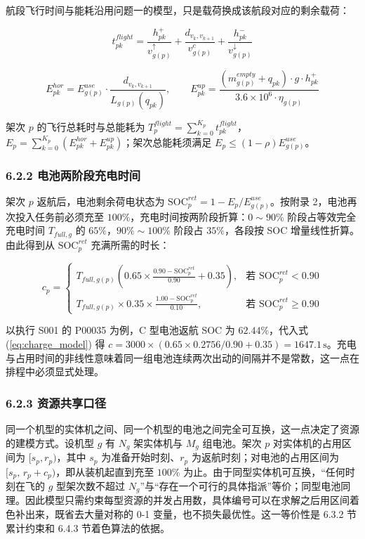 \documentclass[withoutpreface,bwprint]{format}
\begin{document}
航段飞行时间与能耗沿用问题一的模型，只是载荷换成该航段对应的剩余载荷：

\begin{equation}
t_{pk}^{flight} = \frac{h_{pk}^+}{v_{g(p)}^\uparrow} + \frac{d_{v_k, v_{k+1}}}{v_{g(p)}^c} + \frac{h_{pk}^-}{v_{g(p)}^\downarrow}
\end{equation}

\begin{equation}
E_{pk}^{hor} = E_{g(p)}^{use} \cdot \frac{d_{v_k, v_{k+1}}}{L_{g(p)}(q_{pk})}, \qquad E_{pk}^{up} = \frac{(m_{g(p)}^{empty} + q_{pk}) \cdot g \cdot h_{pk}^+}{3.6 \times 10^6 \cdot \eta_{g(p)}}
\end{equation}

架次 $p$ 的飞行总耗时与总能耗为 $T_p^{flight} = \sum_{k=0}^{K_p} t_{pk}^{flight}$，$E_p = \sum_{k=0}^{K_p} (E_{pk}^{hor} + E_{pk}^{up})$；架次总能耗须满足 $E_p \le (1-\rho)E_{g(p)}^{use}$。

\subsubsection{6.2.2 电池两阶段充电时间}
架次 $p$ 返航后，电池剩余荷电状态为 $\text{SOC}_p^{ret} = 1 - E_p / E_{g(p)}^{use}$。按附录 2，电池再次投入任务前必须充至 $100\%$，充电时间按两阶段折算：$0\sim90\%$ 阶段占等效完全充电时间 $T_{full,g}$ 的 $65\%$，$90\%\sim100\%$ 阶段占 $35\%$，各段按 SOC 增量线性折算。由此得到从 $\text{SOC}_p^{ret}$ 充满所需的时长：

\begin{equation}
c_p = \begin{cases}
T_{full, g(p)} \left( 0.65 \times \frac{0.90 - \text{SOC}_p^{ret}}{0.90} + 0.35 \right), & \text{若 } \text{SOC}_p^{ret} < 0.90 \\[0.4em]
T_{full, g(p)} \times 0.35 \times \frac{1.00 - \text{SOC}_p^{ret}}{0.10}, & \text{若 } \text{SOC}_p^{ret} \ge 0.90
\end{cases}
\label{eq:charge_model}
\end{equation}

以执行 S001 的 P00035 为例，C 型电池返航 SOC 为 $62.44\%$，代入式 (\ref{eq:charge_model}) 得 $c = 3000 \times (0.65 \times 0.2756/0.90 + 0.35) = 1647.1\,\text{s}$。充电与占用时间的非线性意味着同一组电池连续两次出动的间隔并不是常数，这一点在排程中必须显式处理。

\subsubsection{6.2.3 资源共享口径}
同一个机型的实体机之间、同一个机型的电池之间完全可互换，这一点决定了资源的建模方式。设机型 $g$ 有 $N_g$ 架实体机与 $M_g$ 组电池。架次 $p$ 对实体机的占用区间为 $[s_p, r_p)$，其中 $s_p$ 为准备开始时刻、$r_p$ 为返航时刻；对电池的占用区间为 $[s_p,\, r_p + c_p)$，即从装机起直到充至 $100\%$ 为止。由于同型实体机可互换，“任何时刻在飞的 $g$ 型架次数不超过 $N_g$”与“存在一个可行的具体指派”等价；同型电池同理。因此模型只需约束每型资源的并发占用数，具体编号可以在求解之后用区间着色补出来，既省去大量对称的 0-1 变量，也不损失最优性。这一等价性是 6.3.2 节累计约束和 6.4.3 节着色算法的依据。
\end{document}
